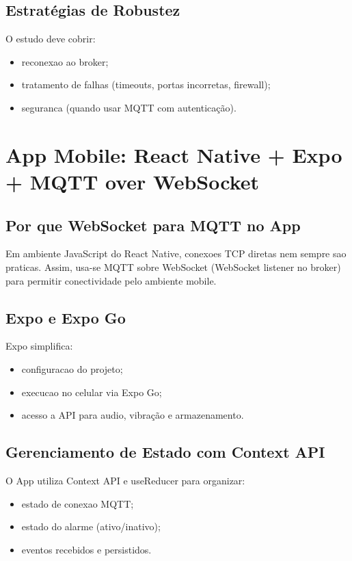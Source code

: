\subsection{Estratégias de Robustez}
O estudo deve cobrir:
\begin{itemize}
  \item reconexao ao broker;
  \item tratamento de falhas (timeouts, portas incorretas, firewall);
  \item seguranca (quando usar MQTT com autenticação).
\end{itemize}

\section{App Mobile: React Native + Expo + MQTT over WebSocket}

\subsection{Por que WebSocket para MQTT no App}
Em ambiente JavaScript do React Native, conexoes TCP diretas nem sempre sao praticas. Assim, usa-se MQTT sobre WebSocket (WebSocket listener no broker) para permitir conectividade pelo ambiente mobile.

\subsection{Expo e Expo Go}
Expo simplifica:
\begin{itemize}
  \item configuracao do projeto;
  \item execucao no celular via Expo Go;
  \item acesso a API para audio, vibração e armazenamento.
\end{itemize}

\subsection{Gerenciamento de Estado com Context API}
O App utiliza Context API e useReducer para organizar:
\begin{itemize}
  \item estado de conexao MQTT;
  \item estado do alarme (ativo/inativo);
  \item eventos recebidos e persistidos.
\end{itemize}

